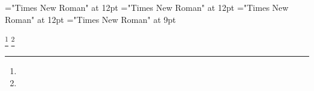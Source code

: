 \documentclass[a4paper]{article}
\begin{document}
 
\pagestyle{plain} 
\sloppy 
\font\scriptureTextscrBody="Times New Roman" at 12pt
\font\sectionscriptureTextscrBody="Times New Roman" at 12pt
\font\psectionscriptureTextscrBody="Times New Roman" at 12pt
\font\footnotepsectionscriptureTextscrBody="Times New Roman" at 9pt

\pagestyle{fancy} 

 \footnote { }  \footnote { } 
\end{document}
